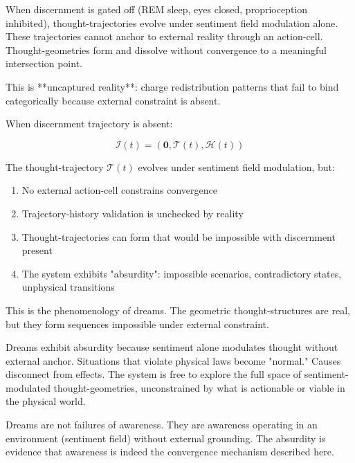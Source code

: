 \begin{definition}
\label{def:uncaptured}
When discernment is gated off (REM sleep, eyes closed, proprioception inhibited), thought-trajectories evolve under sentiment field modulation alone. These trajectories cannot anchor to external reality through an action-cell. Thought-geometries form and dissolve without convergence to a meaningful intersection point.

This is **uncaptured reality**: charge redistribution patterns that fail to bind categorically because external constraint is absent.
\end{definition}

\begin{theorem}
\label{thm:absurdity-mechanism}
When discernment trajectory is absent:

\begin{equation}
\mathcal{I}(t) = (\mathbf{0}, \mathcal{T}(t), \mathcal{H}(t))
\end{equation}

The thought-trajectory $\mathcal{T}(t)$ evolves under sentiment field modulation, but:

\begin{enumerate}[label=(\arabic*),leftmargin=*]
\item No external action-cell constrains convergence
\item Trajectory-history validation is unchecked by reality
\item Thought-trajectories can form that would be impossible with discernment present
\item The system exhibits "absurdity": impossible scenarios, contradictory states, unphysical transitions
\end{enumerate}

This is the phenomenology of dreams. The geometric thought-structures are real, but they form sequences impossible under external constraint.
\end{theorem}

\begin{corollary}
Dreams exhibit absurdity because sentiment alone modulates thought without external anchor. Situations that violate physical laws become "normal." Causes disconnect from effects. The system is free to explore the full space of sentiment-modulated thought-geometries, unconstrained by what is actionable or viable in the physical world.

Dreams are not failures of awareness. They are awareness operating in an environment (sentiment field) without external grounding. The absurdity is evidence that awareness is indeed the convergence mechanism described here.
\end{corollary}

